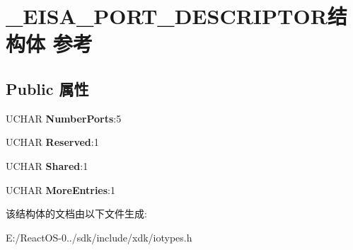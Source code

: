 \hypertarget{struct___e_i_s_a___p_o_r_t___d_e_s_c_r_i_p_t_o_r}{}\section{\+\_\+\+E\+I\+S\+A\+\_\+\+P\+O\+R\+T\+\_\+\+D\+E\+S\+C\+R\+I\+P\+T\+O\+R结构体 参考}
\label{struct___e_i_s_a___p_o_r_t___d_e_s_c_r_i_p_t_o_r}
\subsection*{Public 属性}
\begin{DoxyCompactItemize}
\item 
\mbox{\label{struct___e_i_s_a___p_o_r_t___d_e_s_c_r_i_p_t_o_r_a5a091380080dd49761c4dcc8e66edc63}} 
U\+C\+H\+AR {\bfseries Number\+Ports}\+:5
\item 
\mbox{\label{struct___e_i_s_a___p_o_r_t___d_e_s_c_r_i_p_t_o_r_a4ae8c6799909ac0267a2331decadd026}} 
U\+C\+H\+AR {\bfseries Reserved}\+:1
\item 
\mbox{\label{struct___e_i_s_a___p_o_r_t___d_e_s_c_r_i_p_t_o_r_af99086f8b5e414ebe5a6fa0c23060791}} 
U\+C\+H\+AR {\bfseries Shared}\+:1
\item 
\mbox{\label{struct___e_i_s_a___p_o_r_t___d_e_s_c_r_i_p_t_o_r_a8d0b124fb6d265c97c3ffd1e3a473703}} 
U\+C\+H\+AR {\bfseries More\+Entries}\+:1
\end{DoxyCompactItemize}


该结构体的文档由以下文件生成\+:\begin{DoxyCompactItemize}
\item 
E\+:/\+React\+O\+S-\/0../sdk/include/xdk/iotypes.\+h\end{DoxyCompactItemize}
